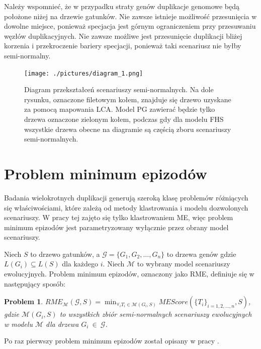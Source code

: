 \documentclass[licencjacka]{pracamgr}
\begin{document}
Należy wspomnieć, że w przypadku straty genów duplikacje genomowe będą położone niżej na drzewie gatunków. Nie zawsze istnieje możliwość przesunięcia w dowolne miejsce, ponieważ specjacja jest górnym ograniczeniem przy przesuwaniu węzłów duplikacyjnych. Nie zawsze możliwe jest przesunięcie duplikacji bliżej korzenia i przekroczenie bariery specjacji, ponieważ taki scenariusz nie byłby semi-normalny.

\begin{figure}[H]\label{diagram_red}
  \centering
  \texttt{[image: ./pictures/diagram\_1.png]}
  \caption{Diagram przekształceń scenariuszy semi-normalnych. Na dole rysunku, oznaczone filetowym kołem, znajduje się drzewo uzyskane za pomocą mapowania LCA. Model PG zawierać będzie tylko drzewa oznaczone zielonym kołem, podczas gdy dla modelu FHS wszystkie drzewa obecne na diagramie są częścią zboru scenariuszy semi-normalnych.}
\end{figure}

\section{Problem minimum epizodów}

Badania wielokrotnych duplikacji generują szeroką klasę problemów różniących się właściwościami, które zależą od metody klastrowania i modelu dozwolonych scenariuszy. W pracy tej zajęto się tylko klastrowaniem ME, więc problem minimum epizodów jest parametryzowany wyłącznie przez obrany model scenariuszy. 

Niech $S$ to drzewo gatunków, a $\mathcal{G}=\{G_1,G_2, \dots , G_n\}$ to drzewa genów gdzie $L(G_i) \subseteq L(S)$ dla każdego $i$. Niech $\mathcal{M}$ to wybrany model scenariuszy ewolucyjnych. Problem minimum epizodów, oznaczony jako RME, definiuje się w następujący sposób:

\newtheorem{problem}{Problem}
\begin{problem}
  ${RME}_{\mathcal{M}}(\mathcal{G}, S) = \min_{\forall_i T_i \in \mathcal{M}(G_i,S)}MEScore(\lbrace T_i \rbrace_{i=1,2,\dots,n},S)$, gdzie $\mathcal{M}(G_i,S)$ to wszystkich zbiór semi-normalnych scenariuszy ewolucyjnych w modelu $\mathcal{M}$ dla drzewa $G_i~\in~\mathcal{G}$.
\end{problem}

Po raz pierwszy problem minimum epizodów został opisany w pracy \cite{guigo}.
\end{document}
